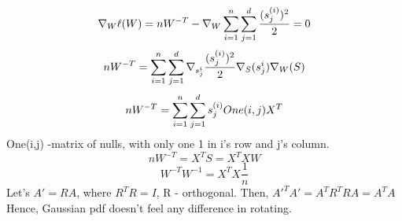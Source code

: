 \begin{answer}
$$\nabla_{W}\ell(W) = nW^{-T} - \nabla_{W} \sum_{i=1}^{n}  \sum_{j=1}^d \frac{(s_j^{(i)})^2}{2} = 0$$
$$nW^{-T} = \sum_{i=1}^{n}  \sum_{j=1}^d \nabla_{s_j^{i}} \frac{(s_j^{(i)})^2}{2} \nabla_{S}(s_j^{i})  \nabla_{W}(S) $$
$$nW^{-T} = \sum_{i=1}^{n}  \sum_{j=1}^d s_j^{(i)} One(i,j) X^T $$
One(i,j) -matrix of nulls, with only one 1 in i's row and j's column.
$$nW^{-T} = X^T S= X^TXW  $$
$$W^{-T}W^{-1} = X^TX \frac{1}{n}$$
Let's $A' = RA$, where $R^TR = I$, R - orthogonal.
Then, $A'^TA' = A^TR^TRA = A^TA$
Hence, Gaussian pdf doesn't feel any difference in rotating.
\end{answer}
